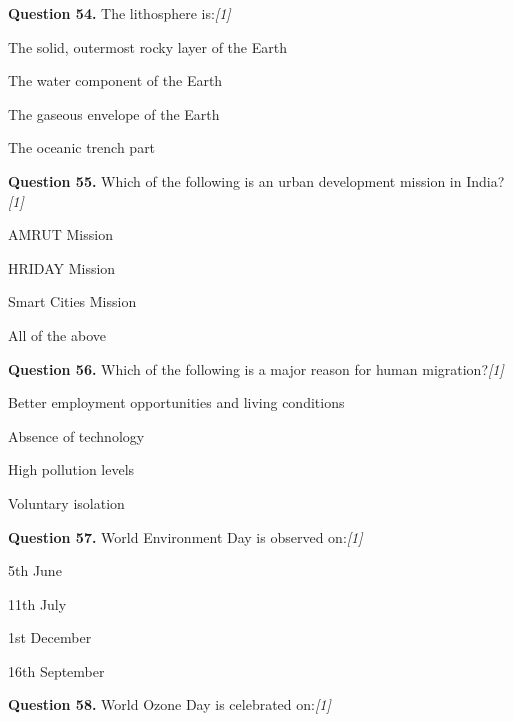 \documentclass[11pt,a4paper]{article}
\newcommand{\pts}[1]{\hfill   \textit{[#1]}}
\begin{document}
\medskip


\noindent   \textbf{Question 54.} The lithosphere is:\pts{1}

\begin{parts}
  \item The solid, outermost rocky layer of the Earth
  \item The water component of the Earth
  \item The gaseous envelope of the Earth
  \item The oceanic trench part
\end{parts}

\medskip


\noindent   \textbf{Question 55.} Which of the following is an urban development mission in India?\pts{1}

\begin{parts}
  \item AMRUT Mission
  \item HRIDAY Mission
  \item Smart Cities Mission
  \item All of the above
\end{parts}

\medskip


\noindent   \textbf{Question 56.} Which of the following is a major reason for human migration?\pts{1}

\begin{parts}
  \item Better employment opportunities and living conditions
  \item Absence of technology
  \item High pollution levels
  \item Voluntary isolation
\end{parts}

\medskip


\noindent   \textbf{Question 57.} World Environment Day is observed on:\pts{1}

\begin{parts}
  \item 5th June
  \item 11th July
  \item 1st December
  \item 16th September
\end{parts}

\medskip


\noindent   \textbf{Question 58.} World Ozone Day is celebrated on:\pts{1}
\end{document}
